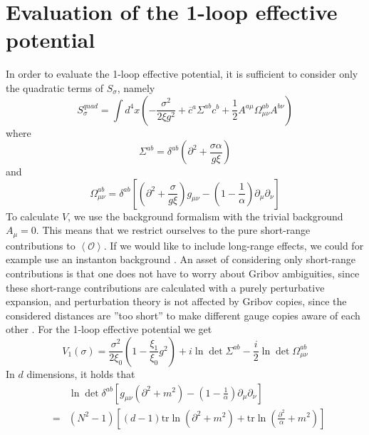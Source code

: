 \documentclass[a4paper,12pt]{article}
\newcommand{\text}{\textrm}
\newcommand{\sect}[1]{ \section{#1} \setcounter{equation}{0} }
\begin{document}
\sect{Evaluation of the 1-loop effective potential}

\label{sec5} In order to evaluate the 1-loop effective potential, it is
sufficient to consider only the quadratic terms of $S_{\sigma }$, namely
\begin{equation}
S_{\sigma }^{quad}=\int d^{4}x\left( -\frac{\sigma ^{2}}{2\xi g^{2}}+%
\overline{c}^{a}\Sigma ^{ab}c^{b}+\frac{1}{2}A^{a\mu }\Omega _{\mu \nu
}^{ab}A^{b\nu }\right)   \label{sseff}
\end{equation}
where
\begin{equation}
\Sigma ^{ab}=\delta ^{ab}\left( \partial ^{2}+\frac{\sigma \alpha }{g\xi }%
\right)   \label{sab}
\end{equation}
and
\begin{equation}
\Omega _{\mu \nu }^{ab}=\delta ^{ab}\left[ \left( \partial ^{2}+\frac{\sigma
}{g\xi }\right) g_{\mu \nu }-\left( 1-\frac{1}{\alpha }\right) \partial
_{\mu }\partial _{\nu }\right]   \label{omab}
\end{equation}
To calculate $V$, we use the background formalism with the trivial
background $A_{\mu }=0$. This means that we restrict ourselves to the pure
short-range contributions to $\left\langle \mathcal{O}\right\rangle $. If we
would like to include long-range effects, we could for example use an
instanton background \cite{Boucaud:2002nc}. An asset of considering only
short-range contributions is that one does not have to worry about Gribov
ambiguities, since these short-range contributions are calculated with a
purely perturbative expansion, and perturbation theory is not affected by
Gribov copies, since the considered distances are ''too short'' to make
different gauge copies aware of each other \cite
{Williams:2002nq,Williams:2002dw,Frishman:1978ke,Frishman:gy}.\newline
\newline
For the 1-loop effective potential we get
\begin{equation}
V_{1}(\sigma )=\frac{\sigma ^{2}}{2\xi _{0}}\left( 1-\frac{\xi _{1}}{\xi _{0}%
}g^{2}\right) +i\ln \det \Sigma ^{ab}-\frac{i}{2}\ln \det \Omega _{\mu \nu
}^{ab}  \label{v}
\end{equation}
In $d$ dimensions, it holds that
\begin{eqnarray}
&&\ln \det \delta ^{ab}\left[ g_{\mu \nu }\left( \partial ^{2}+m^{2}\right)
-\left( 1-\frac{1}{\alpha }\right) \partial _{\mu }\partial _{\nu }\right]
\nonumber  \label{e1} \\
&=&\left( N^{2}-1\right) \left[ (d-1)\text{tr}\ln \left( \partial
^{2}+m^{2}\right) +\text{tr}\ln \left( \frac{\partial ^{2}}{\alpha }%
+m^{2}\right) \right]
\end{eqnarray}
\end{document}
